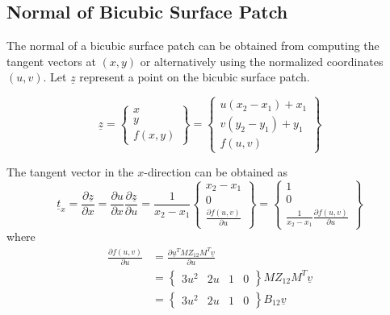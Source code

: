 \documentclass[
10pt, %
a4paper, %
oneside, %
headinclude,footinclude, %
BCOR5mm, %
]{scrartcl}
\begin{document}
\subsection{Normal of Bicubic Surface Patch}
The normal of a bicubic surface patch can be obtained from computing the tangent vectors at $(x,y)$ or alternatively using the normalized coordinates $(u,v)$. Let $\underline{z}$ represent a point on the bicubic surface patch.

\begin{equation}
  \underline{z} = \begin{Bmatrix} x \\ y \\ f(x, y) \end{Bmatrix} = \begin{Bmatrix} u (x_2 - x_1 ) + x_1 \\ v (y_2 - y_1) + y_1 \\ f(u, v)   \end{Bmatrix}
\end{equation}

The tangent vector in the $x$-direction can be obtained as
\begin{equation}
\underline{t}_x = \frac{\partial \underline{z}}{\partial x} =  \frac{\partial u}{\partial x} \frac{\partial \underline{z}}{\partial u}  = \frac{1}{x_2 - x_1} \begin{Bmatrix} {x_2 - x_1} \\ 0 \\ \frac{\partial f(u,v)}{\partial u} \end{Bmatrix} =
\begin{Bmatrix} 1 \\ 0 \\ \frac{1}{x_2 - x_1} \frac{\partial f(u,v)}{\partial u} \end{Bmatrix}
\end{equation}
where
\begin{equation}
  \begin{split}
    \frac{\partial f(u,v)}{\partial u}
      &= \frac{\partial \underline{u}^T M Z_{12} M^T \underline{v}}{\partial u}\\
      &= \begin{Bmatrix}3u^2 & 2u & 1 & 0\end{Bmatrix}  M Z_{12} M^T \underline{v}\\
      &= \begin{Bmatrix}3u^2 & 2u & 1 & 0\end{Bmatrix}  B_{12} \underline{v}
  \end{split}
\end{equation}
\end{document}
